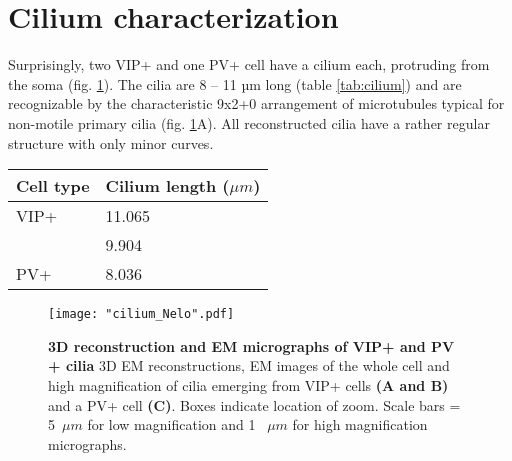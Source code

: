 \section{Cilium characterization}
\label{sec:cilium}
Surprisingly, two VIP+ and one PV+ cell have a cilium each, protruding from the soma (fig. \ref{fig:cilium}). The cilia are 8 – 11 µm long (table \ref{tab:cilium}) and are recognizable by the characteristic 9x2+0 arrangement of microtubules typical for non-motile primary cilia (fig. \ref{fig:cilium}A). All reconstructed cilia have a rather regular structure with only minor curves. \\
\label{tab:cilium}
\begin{tabular}[pos=t]{|l|l|}
	\hline
	Cell type & Cilium length ($\mu m$)\\
	\hline
	VIP+ & 11.065\\ \cline{2-2}
	& 9.904\\
	\hline
	PV+ & 8.036\\
	\hline
\end{tabular}
\begin{figure}
	\captionsetup[figure]{indentation=0pt}
	\texttt{[image: "cilium\_Nelo".pdf]}
	\caption{\textbf{3D reconstruction and EM micrographs of VIP+ and PV + cilia} 3D EM reconstructions, EM images of the whole cell and high magnification of cilia emerging from VIP+ cells \textbf{(A and B)} and a PV+ cell \textbf{(C)}. Boxes indicate location of zoom. Scale bars = 5~$\mu m$ for low magnification and 1 ~$\mu m$ for high magnification micrographs.}
	\label{fig:cilium}
\end{figure}

